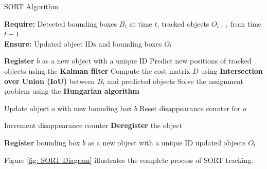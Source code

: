 \documentclass{CSSRforAfrica}
\begin{document}
\begin{algorithm}
	\caption{SORT Algorithm}
	\textbf{Require:} Detected bounding boxes $B_t$ at time $t$, tracked objects $O_{t-1}$ from time $t-1$ \\
	\textbf{Ensure:} Updated object IDs and bounding boxes $O_t$
	\begin{algorithmic}[1]
		\State \textbf{Register} $b$ as a new object with a unique ID
		\EndFor
		\Else
		\State Predict new positions of tracked objects using the \textbf{Kalman filter}
		\State Compute the cost matrix $D$ using \textbf{Intersection over Union (IoU)} between $B_t$ and predicted objects
		\State Solve the assignment problem using the \textbf{Hungarian algorithm}
		
		\State Update object $o$ with new bounding box $b$
		\State Reset disappearance counter for $o$
		\EndFor
		
		\State Increment disappearance counter
		\State \textbf{Deregister} the object
		\EndIf
		\EndFor
		
		\State \textbf{Register} bounding box $b$ as a new object with a unique ID
		\EndFor
		\EndIf
		\State \Return updated objects $O_t$
	\end{algorithmic}
\end{algorithm}

\newpage

Figure \ref{fig: SORT Diagram} illustrates the complete process of SORT tracking.
\end{document}
